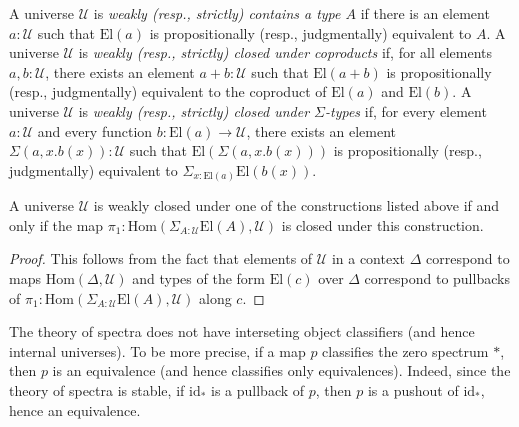 \documentclass[reqno]{mscs}
\newcommand{\fs}[1]{\mathrm{#1}}
\newcommand{\Hom}{\fs{Hom}}
\newcommand{\El}{\fs{El}}
\numberwithin{figure}{section}
\begin{document}
A universe $\mathcal{U}$ is \emph{weakly (resp., strictly) contains a type $A$} if there is an element $a : \mathcal{U}$ such that $\El(a)$ is propositionally (resp., judgmentally) equivalent to $A$. 
A universe $\mathcal{U}$ is \emph{weakly (resp., strictly) closed under coproducts} if, for all elements $a,b : \mathcal{U}$, there exists an element $a + b : \mathcal{U}$ such that $\El(a + b)$ is propositionally (resp., judgmentally) equivalent to the coproduct of $\El(a)$ and $\El(b)$.
A universe $\mathcal{U}$ is \emph{weakly (resp., strictly) closed under $\Sigma$-types} if, for every element $a : \mathcal{U}$ and every function $b : \El(a) \to \mathcal{U}$, there exists an element $\Sigma(a,x.b(x)) : \mathcal{U}$ such that $\El(\Sigma(a,x.b(x)))$ is propositionally (resp., judgmentally) equivalent to $\Sigma_{x : \El(a)} \El(b(x))$.

\begin{prop}
A universe $\mathcal{U}$ is weakly closed under one of the constructions listed above if and only if the map $\pi_1 : \Hom(\Sigma_{A : \mathcal{U}} \El(A), \mathcal{U})$ is closed under this construction.
\end{prop}
\begin{proof}
This follows from the fact that elements of $\mathcal{U}$ in a context $\Delta$ correspond to maps $\Hom(\Delta, \mathcal{U})$ and
types of the form $\El(c)$ over $\Delta$ correspond to pullbacks of $\pi_1 : \Hom(\Sigma_{A : \mathcal{U}} \El(A), \mathcal{U})$ along $c$.
\end{proof}

\begin{example}
The theory of spectra does not have interseting object classifiers (and hence internal universes).
To be more precise, if a map $p$ classifies the zero spectrum $*$, then $p$ is an equivalence (and hence classifies only equivalences).
Indeed, since the theory of spectra is stable, if $\fs{id}_*$ is a pullback of $p$, then $p$ is a pushout of $\fs{id}_*$, hence an equivalence.
\end{example}
\end{document}
